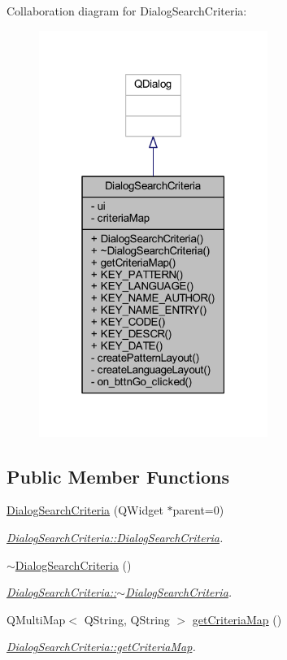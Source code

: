 Collaboration diagram for Dialog\+Search\+Criteria\+:
\nopagebreak
\begin{figure}[H]
\begin{center}
\leavevmode
\includegraphics[width=211pt]{class_dialog_search_criteria__coll__graph}
\end{center}
\end{figure}
\subsection*{Public Member Functions}
\begin{DoxyCompactItemize}
\item 
\hyperlink{class_dialog_search_criteria_a1f739719a87720517a8c1c8034ab4f83}{Dialog\+Search\+Criteria} (Q\+Widget $\ast$parent=0)
\begin{DoxyCompactList}\small\item\em \hyperlink{class_dialog_search_criteria_a1f739719a87720517a8c1c8034ab4f83}{Dialog\+Search\+Criteria\+::\+Dialog\+Search\+Criteria}. \end{DoxyCompactList}\item 
\hyperlink{class_dialog_search_criteria_af48ae5e81e28ddcc2a209f3d2e5a10fd}{$\sim$\+Dialog\+Search\+Criteria} ()
\begin{DoxyCompactList}\small\item\em \hyperlink{class_dialog_search_criteria_af48ae5e81e28ddcc2a209f3d2e5a10fd}{Dialog\+Search\+Criteria\+::$\sim$\+Dialog\+Search\+Criteria}. \end{DoxyCompactList}\item 
Q\+Multi\+Map$<$ Q\+String, Q\+String $>$ \hyperlink{class_dialog_search_criteria_a4580f445b0386b977d30694afd0d0c22}{get\+Criteria\+Map} ()
\begin{DoxyCompactList}\small\item\em \hyperlink{class_dialog_search_criteria_a4580f445b0386b977d30694afd0d0c22}{Dialog\+Search\+Criteria\+::get\+Criteria\+Map}. \end{DoxyCompactList}\end{DoxyCompactItemize}
